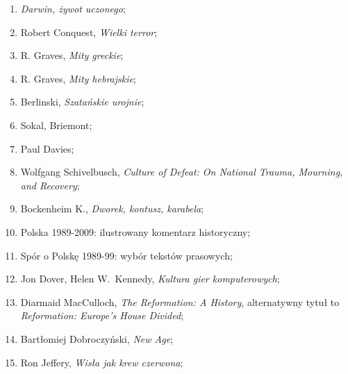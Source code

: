 \documentclass[a4paper,11pt]{article}
\begin{document}
\begin{enumerate}
\item \textit{Darwin, żywot uczonego};



\item Robert Conquest, \textit{Wielki terror};



\item R. Graves, \textit{Mity greckie};



\item R. Graves, \textit{Mity hebrajskie};



\item Berlinski, \textit{Szatańskie urojnie};



\item Sokal, Briemont;



\item Paul Davies;



\item Wolfgang Schivelbusch, \textit{Culture of Defeat: On National
    Trauma, Mourning, and Recovery};



\item Bockenheim K., \textit{Dworek, kontusz, karabela};



\item Polska 1989-2009: ilustrowany komentarz historyczny;



\item Spór o Polskę 1989-99: wybór tekstów prasowych;



\item Jon Dover, Helen W.~Kennedy, \textit{Kultura gier komputerowych};



\item Diarmaid MacCulloch, \textit{The Reformation: A History},
  alternatywny tytuł to \textit{Reformation: Europe's House Divided};



\item Bartłomiej Dobroczyński, \textit{New Age};



\item Ron Jeffery, \textit{Wisła jak krew czerwona};




\end{enumerate}
\end{document}
